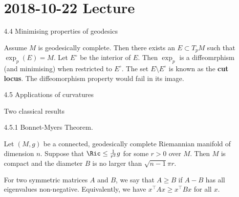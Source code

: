 \section{2018-10-22 Lecture}

4.4 Minimising properties of geodesics

Assume $M$ is geodesically complete.
Then there exists an $E \subset T_pM$ such that $\exp_p(E)=M$.
Let $E^\circ$ be the interior of $E$.
Then $\exp_p$ is a diffeomrphism (and minimising) when restricted to $E^\circ$.
The set $E\setminus E^\circ$ is known as the \textbf{cut locus}.
The diffeomorphism property would fail in its image.

4.5 Applications of curvatures

Two classical results

4.5.1 Bonnet-Myers Theorem.

\begin{thm}[4.7]
  Let $(M,g)$ be a connected, geodesically complete Riemannian manifold of dimension $n$.
  Suppose that $\Ric\leq\tfrac1{r^2}g$ for some $r>0$ over $M$.
  Then $M$ is compact and the diameter $B$ is no larger than $\sqrt{n-1}\pi r$.
\end{thm}

\begin{rmk}
  For two symmetric matrices $A$ and $B$, we say that $A \geq B$ if $A-B$ has all eigenvalues non-negative.
  Equivalently, we have $x^\intercal Ax\geq x^\intercal Bx$ for all $x$.
\end{rmk}

